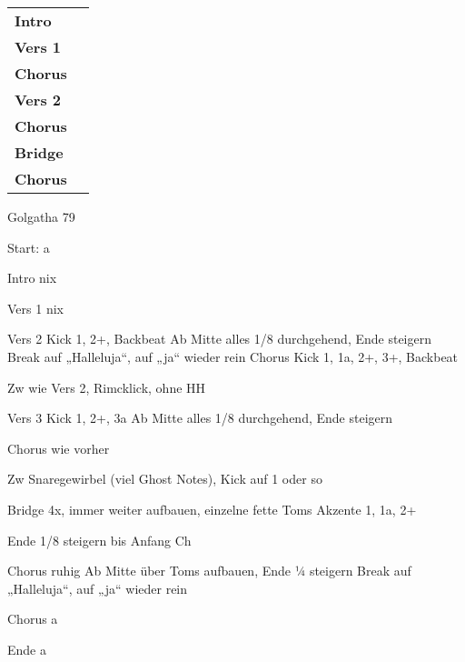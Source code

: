 
\begin{tabular}{p{1.6cm}l}
	\textbf{Intro}  & \\
	\textbf{Vers 1} & \\
	\textbf{Chorus} & \\
	\textbf{Vers 2} & \\
	\textbf{Chorus} & \\
	\textbf{Bridge} & \\
	\textbf{Chorus} & \\
\end{tabular}
Golgatha												79


Start:	a

Intro		nix

Vers 1	nix

Vers 2	Kick 1, 2+, Backbeat
	Ab Mitte alles 1/8 durchgehend, Ende steigern
	Break auf „Halleluja“, auf „ja“ wieder rein
Chorus	Kick 1, 1a, 2+, 3+, Backbeat

Zw		wie Vers 2, Rimcklick, ohne HH

Vers 3	Kick 1, 2+, 3a
	Ab Mitte alles 1/8 durchgehend, Ende steigern

Chorus	wie vorher

Zw		Snaregewirbel (viel Ghost Notes), Kick auf 1 oder so

Bridge	4x, immer weiter aufbauen, einzelne fette Toms
	Akzente 1, 1a, 2+

	Ende 1/8 steigern bis Anfang Ch

Chorus	ruhig
	Ab Mitte über Toms aufbauen, Ende ¼ steigern
	Break auf „Halleluja“, auf „ja“ wieder rein

Chorus	a

Ende		a
